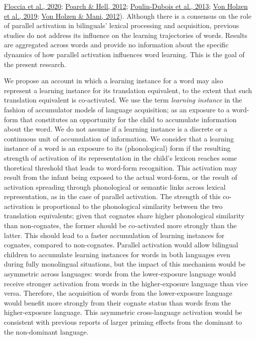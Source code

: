 \documentclass[
]{article}
\begin{document}
\protect\hyperlink{ref-floccia2020translation}{Floccia et al., 2020};
\protect\hyperlink{ref-poarch2012crosslanguage}{Poarch \& Hell, 2012};
\protect\hyperlink{ref-poulin-dubois2013lexical}{Poulin-Dubois et al.,
2013}; \protect\hyperlink{ref-vonholzen2019impact}{Von Holzen et al.,
2019}; \protect\hyperlink{ref-vonholzen2012language}{Von Holzen \& Mani,
2012}). Although there is a consensus on the role of parallel activation
in bilinguals' lexical processing and acquisition, previous studies do
not address its influence on the learning trajectories of words. Results
are aggregated across words and provide no information about the
specific dynamics of how parallel activation influences word learning.
This is the goal of the present research.

We propose an account in which a learning instance for a word may also
represent a learning instance for its translation equivalent, to the
extent that such translation equivalent is co-activated. We use the term
\emph{learning instance} in the fashion of accumulator models of
language acquisition; as an exposure to a word-form that constitutes an
opportunity for the child to accumulate information about the word. We
do not assume if a learning instance is a discrete or a continuous unit
of accumulation of information. We consider that a learning instance of
a word is an exposure to its (phonological) form if the resulting
strength of activation of its representation in the child's lexicon
reaches some thoretical threshold that leads to word-form recognition.
This activation may result from the infant being exposed to the actual
word-form, or the result of activation spreading through phonological or
semantic links across lexical representation, as in the case of parallel
activation. The strength of this co-activation is proportional to the
phonological similarity between the two translation equivalents; given
that cognates share higher phonological similarity than non-cognates,
the former should be co-activated more strongly than the latter. This
should lead to a faster accumulation of learning instances for cognates,
compared to non-cognates. Parallel activation would allow bilingual
children to accumulate learning instances for words in both languages
even during fully monolingual situations, but the impact of this
mechanism would be asymmetric across languages: words from the
lower-exposure language would receive stronger activation from words in
the higher-exposure language than vice versa. Therefore, the acquisition
of words from the lower-exposure language would benefit more strongly
from their cognate status than words from the higher-exposure language.
This asymmetric cross-language activation would be consistent with
previous reports of larger priming effects from the dominant to the
non-dominant language.
\end{document}
